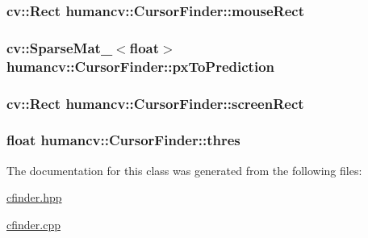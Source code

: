 \hypertarget{classhumancv_1_1_cursor_finder_ac24299e06cd5d271dac727a80bebc5c3}{
\subsubsection[{mouse\-Rect}]{\setlength{\rightskip}{0pt plus 5cm}cv\-::\-Rect {\bf humancv\-::\-Cursor\-Finder\-::mouse\-Rect}}}\label{classhumancv_1_1_cursor_finder_ac24299e06cd5d271dac727a80bebc5c3}
\hypertarget{classhumancv_1_1_cursor_finder_acfdb3b111ce4b2780e5a9f9fddf59e97}{
\subsubsection[{px\-To\-Prediction}]{\setlength{\rightskip}{0pt plus 5cm}cv\-::\-Sparse\-Mat\-\_\-$<$float$>$ {\bf humancv\-::\-Cursor\-Finder\-::px\-To\-Prediction}}}\label{classhumancv_1_1_cursor_finder_acfdb3b111ce4b2780e5a9f9fddf59e97}
\hypertarget{classhumancv_1_1_cursor_finder_a8a6474e4cf616789f7b14085e83261c8}{
\subsubsection[{screen\-Rect}]{\setlength{\rightskip}{0pt plus 5cm}cv\-::\-Rect {\bf humancv\-::\-Cursor\-Finder\-::screen\-Rect}}}\label{classhumancv_1_1_cursor_finder_a8a6474e4cf616789f7b14085e83261c8}
\hypertarget{classhumancv_1_1_cursor_finder_a77b21640a4c7c1f24da2e39c9ae1a4a7}{
\subsubsection[{thres}]{\setlength{\rightskip}{0pt plus 5cm}float {\bf humancv\-::\-Cursor\-Finder\-::thres}}}\label{classhumancv_1_1_cursor_finder_a77b21640a4c7c1f24da2e39c9ae1a4a7}


The documentation for this class was generated from the following files\-:\begin{DoxyCompactItemize}
\item 
\hyperlink{cfinder_8hpp}{cfinder.\-hpp}\item 
\hyperlink{cfinder_8cpp}{cfinder.\-cpp}\end{DoxyCompactItemize}
